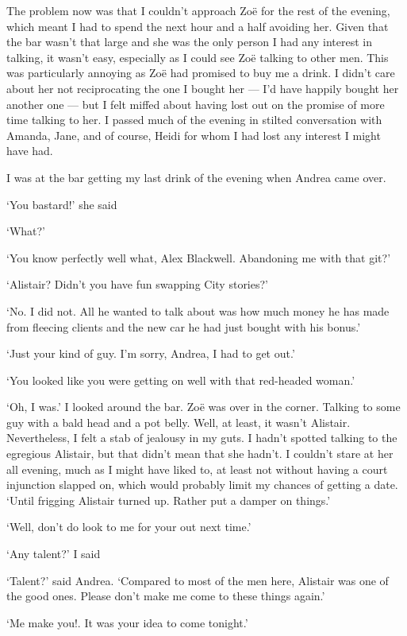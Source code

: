 The problem now was that I couldn't approach Zo{\"e} for the rest of
the evening, which meant I had to spend the next hour and a half
avoiding her. Given that the bar wasn't that large and she was the
only person I had any interest in talking, it wasn't easy,
especially as I could see Zo{\"e} talking to other men. This was particularly annoying as Zo{\"e} had promised to buy me a drink. I didn't care about her not reciprocating the one I bought her --- I'd have happily bought her another one --- but I felt miffed about having lost out on the promise of more time talking to her. I passed
much of the evening in stilted conversation with Amanda, Jane, and
of course, Heidi for whom I had lost any interest I might have had.

I was at the bar getting my last drink of the evening when Andrea
came over.

`You bastard!' she said

`What?'

`You know perfectly well what, Alex Blackwell. Abandoning me with
that git?'

`Alistair? Didn't you have fun swapping City stories?'

`No. I did not. All he wanted to talk about was how much money he
has made from fleecing clients and the new car he had just bought
with his bonus.'

`Just your kind of guy. I'm sorry, Andrea, I had to get out.'

`You looked like you were getting on well with that red-headed
woman.'

`Oh, I was.' I looked around the bar. Zo{\"e} was over in the
corner. Talking to some guy with a bald head and a pot belly. Well,
at least, it wasn't Alistair. Nevertheless, I felt a stab of
jealousy in my guts. I hadn't spotted talking to the egregious
Alistair, but that didn't mean that she hadn't. I couldn't stare at
her all evening, much as I might have liked to, at least not without
having a court injunction slapped on, which would probably limit my
chances of getting a date. `Until frigging Alistair turned up.
Rather put a damper on things.'

`Well, don't do look to me for your out next time.'

`Any talent?' I said

`Talent?' said Andrea. `Compared to most of the men here, Alistair
was one of the good ones. Please don't make me come to these things
again.'

`Me make {\twelveit you!}. It was your idea to come tonight.'

